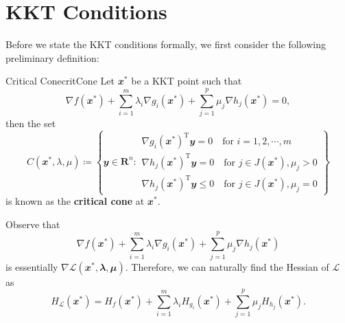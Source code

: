\documentclass[math, code]{amznotes}
\theoremstyle{remark}
\begin{document}
\section{KKT Conditions}
Before we state the KKT conditions formally, we first consider the following preliminary definition:
\begin{dfnbox}{Critical Cone}{critCone}
    Let $\mathbfit{x}^*$ be a KKT point such that
    \begin{equation*}
        \nabla f(\mathbfit{x}^*) + \sum_{i = 1}^{m}\lambda_i\nabla g_i(\mathbfit{x}^*) + \sum_{j = 1}^{p}\mu_j\nabla h_j(\mathbfit{x}^*) = \mathbfit{0},
    \end{equation*}
    then the set
    \begin{equation*}
        C(\mathbfit{x}^*, \lambda, \mu) \coloneqq \left\{\mathbfit{y} \in \mathbf{R}^n \colon \begin{array}{l}
            \nabla g_i(\mathbfit{x}^*)^{\mathrm{T}}\mathbfit{y} = 0 \quad\textrm{for } i = 1, 2, \cdots, m \\
            \nabla h_j(\mathbfit{x}^*)^{\mathrm{T}}\mathbfit{y} = 0 \quad\textrm{for } j \in J(\mathbfit{x^*}), \mu_j > 0 \\
            \nabla h_j(\mathbfit{x}^*)^{\mathrm{T}}\mathbfit{y} \leq 0 \quad\textrm{for } j \in J(\mathbfit{x^*}), \mu_j = 0
        \end{array}\right\}
    \end{equation*}
    is known as the {\color{red} \textbf{critical cone}} at $\mathbfit{x}^*$.
\end{dfnbox}
Observe that
\begin{equation*}
    \nabla f(\mathbfit{x}^*) + \sum_{i = 1}^{m}\lambda_i\nabla g_i(\mathbfit{x}^*) + \sum_{j = 1}^{p}\mu_j\nabla h_j(\mathbfit{x}^*)
\end{equation*}
is essentially $\nabla \mathcal{L}(\mathbfit{x}^*, \mathbfit{\lambda}, \mathbfit{\mu})$. Therefore, we can naturally find the Hessian of $\mathcal{L}$ as
\begin{equation*}
    H_{\mathcal{L}}(\mathbfit{x}^*) = H_f(\mathbfit{x}^*) + \sum_{i = 1}^{m}\lambda_i H_{g_i}(\mathbfit{x}^*) + \sum_{j = 1}^{p}\mu_jH_{h_j}(\mathbfit{x}^*).
\end{equation*}
\end{document}

